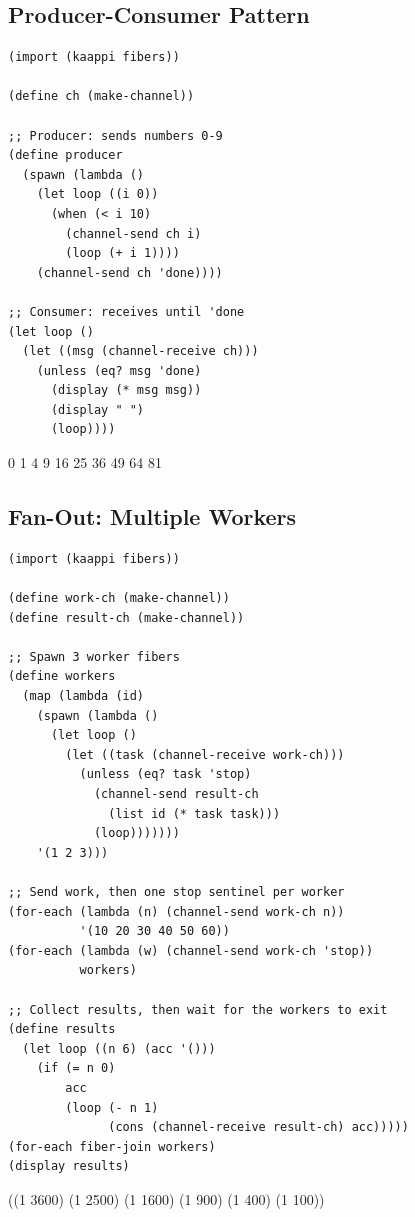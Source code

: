 \subsection{Producer-Consumer Pattern}

\begin{lstlisting}
(import (kaappi fibers))

(define ch (make-channel))

;; Producer: sends numbers 0-9
(define producer
  (spawn (lambda ()
    (let loop ((i 0))
      (when (< i 10)
        (channel-send ch i)
        (loop (+ i 1))))
    (channel-send ch 'done))))

;; Consumer: receives until 'done
(let loop ()
  (let ((msg (channel-receive ch)))
    (unless (eq? msg 'done)
      (display (* msg msg))
      (display " ")
      (loop))))
\end{lstlisting}

\begin{codeoutput}
0 1 4 9 16 25 36 49 64 81
\end{codeoutput}

\subsection{Fan-Out: Multiple Workers}
\label{sec:fan-out}

\begin{lstlisting}
(import (kaappi fibers))

(define work-ch (make-channel))
(define result-ch (make-channel))

;; Spawn 3 worker fibers
(define workers
  (map (lambda (id)
    (spawn (lambda ()
      (let loop ()
        (let ((task (channel-receive work-ch)))
          (unless (eq? task 'stop)
            (channel-send result-ch
              (list id (* task task)))
            (loop)))))))
    '(1 2 3)))

;; Send work, then one stop sentinel per worker
(for-each (lambda (n) (channel-send work-ch n))
          '(10 20 30 40 50 60))
(for-each (lambda (w) (channel-send work-ch 'stop))
          workers)

;; Collect results, then wait for the workers to exit
(define results
  (let loop ((n 6) (acc '()))
    (if (= n 0)
        acc
        (loop (- n 1)
              (cons (channel-receive result-ch) acc)))))
(for-each fiber-join workers)
(display results)
\end{lstlisting}

\begin{codeoutput}
((1 3600) (1 2500) (1 1600) (1 900) (1 400) (1 100))
\end{codeoutput}

